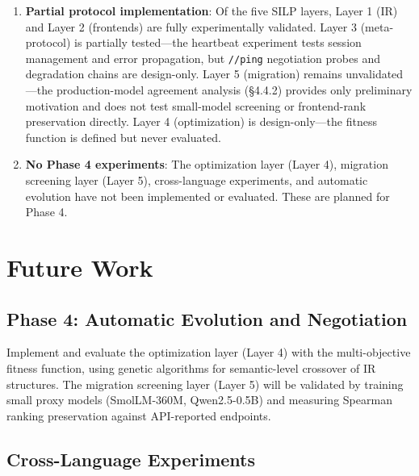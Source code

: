 \documentclass{article}
\begin{document}
\begin{enumerate}
\item

  \textbf{Partial protocol implementation}: Of the five SILP layers, Layer 1 (IR) and Layer 2 (frontends) are fully experimentally validated. Layer 3 (meta-protocol) is partially tested---the heartbeat experiment tests session management and error propagation, but \texttt{//ping} negotiation probes and degradation chains are design-only. Layer 5 (migration) remains unvalidated---the production-model agreement analysis (\S4.4.2) provides only preliminary motivation and does not test small-model screening or frontend-rank preservation directly. Layer 4 (optimization) is design-only---the fitness function is defined but never evaluated.

\item

  \textbf{No Phase 4 experiments}: The optimization layer (Layer 4), migration screening layer (Layer 5), cross-language experiments, and automatic evolution have not been implemented or evaluated. These are planned for Phase 4.

\end{enumerate}



\section{Future Work}\label{future-work}



\subsection{Phase 4: Automatic Evolution and Negotiation}\label{phase-4-automatic-evolution-and-negotiation}



Implement and evaluate the optimization layer (Layer 4) with the multi-objective fitness function, using genetic algorithms for semantic-level crossover of IR structures. The migration screening layer (Layer 5) will be validated by training small proxy models (SmolLM-360M, Qwen2.5-0.5B) and measuring Spearman ranking preservation against API-reported endpoints.



\subsection{Cross-Language Experiments}\label{cross-language-experiments}
\end{document}
